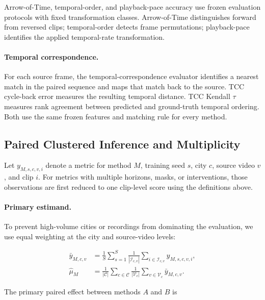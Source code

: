 Arrow-of-Time, temporal-order, and playback-pace accuracy use frozen
evaluation protocols with fixed transformation classes. Arrow-of-Time
distinguishes forward from reversed clips; temporal-order detects frame
permutations; playback-pace identifies the applied temporal-rate
transformation.

\paragraph{Temporal correspondence.}
For each source frame, the temporal-correspondence evaluator identifies
a nearest match in the paired sequence and maps that match back to the
source. TCC cycle-back error measures the resulting temporal distance.
TCC Kendall \(\tau\) measures rank agreement between predicted and
ground-truth temporal ordering. Both use the same frozen features and
matching rule for every method.


\subsection{Paired Clustered Inference and Multiplicity}
\label{app:clustered_statistics}

Let \(y_{M,s,c,v,i}\) denote a metric for method \(M\), training seed
\(s\), city \(c\), source video \(v\), and clip \(i\). For metrics with
multiple horizons, masks, or interventions, those observations are
first reduced to one clip-level score using the definitions above.

\paragraph{Primary estimand.}
To prevent high-volume cities or recordings from dominating the
evaluation, we use equal weighting at the city and source-video levels:

\begin{equation*}
\begin{aligned}
\bar y_{M,c,v}
&=
\frac{1}{S}
\sum_{s=1}^{S}
\frac{1}{|\mathcal I_{c,v}|}
\sum_{i\in\mathcal I_{c,v}}
y_{M,s,c,v,i},
\\
\widehat\mu_M
&=
\frac{1}{|\mathcal C|}
\sum_{c\in\mathcal C}
\frac{1}{|\mathcal V_c|}
\sum_{v\in\mathcal V_c}
\bar y_{M,c,v}.
\end{aligned}
\end{equation*}

The primary paired effect between methods \(A\) and \(B\) is

